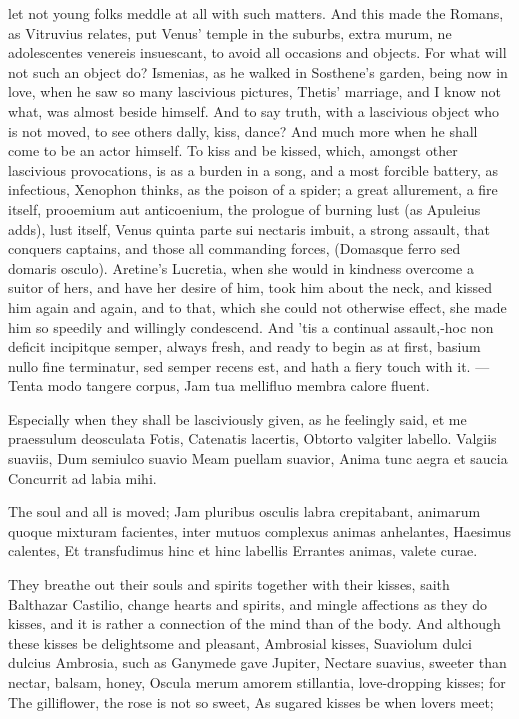 {let not young folks meddle at all with such matters. And this made the
Romans, as Vitruvius relates, put Venus' temple in the suburbs,
extra murum, ne adolescentes venereis insuescant, to avoid all
occasions and objects. For what will not such an object do? Ismenias,
as he walked in Sosthene's garden, being now in love, when he saw so
many lascivious pictures, Thetis' marriage, and I know not what,
was almost beside himself. And to say truth, with a lascivious object
who is not moved, to see others dally, kiss, dance? And much more when
he shall come to be an actor himself.
To kiss and be kissed, which, amongst other lascivious provocations, is
as a burden in a song, and a most forcible battery, as infectious,
 Xenophon thinks, as the poison of a spider; a great allurement,
a fire itself, prooemium aut anticoenium, the prologue of burning lust
(as Apuleius adds), lust itself, Venus quinta parte sui nectaris
imbuit, a strong assault, that conquers captains, and those all
commanding forces, (Domasque ferro sed domaris osculo).
Aretine's Lucretia, when she would in kindness overcome a suitor
of hers, and have her desire of him, took him about the neck, and
kissed him again and again, and to that, which she could not otherwise
effect, she made him so speedily and willingly condescend. And 'tis a
continual assault,-hoc non deficit incipitque semper, always
fresh, and ready to begin as at first, basium nullo fine
terminatur, sed semper recens est, and hath a fiery touch with it.
---Tenta modo tangere corpus,
Jam tua mellifluo membra calore fluent.

Especially when they shall be lasciviously given, as he feelingly said,
et me praessulum deosculata Fotis, Catenatis lacertis, 
Obtorto valgiter labello.
Valgiis suaviis,
Dum semiulco suavio
Meam puellam suavior,
Anima tunc aegra et saucia
Concurrit ad labia mihi.

The soul and all is moved; Jam pluribus osculis labra
crepitabant, animarum quoque mixturam facientes, inter mutuos complexus
animas anhelantes,
Haesimus calentes,
Et transfudimus hinc et hinc labellis
Errantes animas, valete curae.

They breathe out their souls and spirits together with their kisses,
saith Balthazar Castilio, change hearts and spirits, and mingle
affections as they do kisses, and it is rather a connection of the mind
than of the body. And although these kisses be delightsome and
pleasant, Ambrosial kisses, Suaviolum dulci dulcius Ambrosia,
such as  Ganymede gave Jupiter, Nectare suavius, sweeter than
nectar, balsam, honey, Oscula merum amorem stillantia,
love-dropping kisses; for
The gilliflower, the rose is not so sweet,
As sugared kisses be when lovers meet;

}
